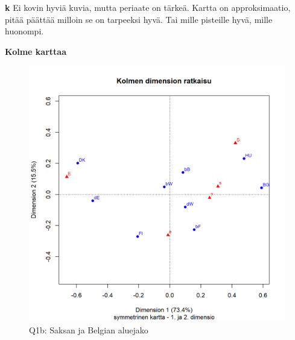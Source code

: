 \documentclass[
  finnish,
]{book}
\newenvironment{Shaded}{\begin{snugshade}}{\end{snugshade}}
\newcommand{\CommentTok}[1]{\textcolor[rgb]{0.56,0.35,0.01}{\textit{#1}}}
\newcommand{\DataTypeTok}[1]{\textcolor[rgb]{0.13,0.29,0.53}{#1}}
\newcommand{\DecValTok}[1]{\textcolor[rgb]{0.00,0.00,0.81}{#1}}
\newcommand{\KeywordTok}[1]{\textcolor[rgb]{0.13,0.29,0.53}{\textbf{#1}}}
\newcommand{\NormalTok}[1]{#1}
\newcommand{\OperatorTok}[1]{\textcolor[rgb]{0.81,0.36,0.00}{\textbf{#1}}}
\newcommand{\StringTok}[1]{\textcolor[rgb]{0.31,0.60,0.02}{#1}}
\begin{document}
\textbf{k} Ei kovin hyviä kuvia, mutta periaate on tärkeä. Kartta on
approksimaatio, pitää päättää milloin se on tarpeeksi hyvä. Tai mille
pisteille hyvä, mille huonompi.

\begin{Shaded}
\end{Shaded}

\textbf{Kolme karttaa}

\begin{figure}

{\centering \includegraphics[width=0.9\linewidth]{JH_capaper_files/figure-latex/suppointCA3map1-1} 

}

\caption{Q1b: Saksan ja  Belgian aluejako }\label{fig:suppointCA3map1}
\end{figure}
\end{document}

